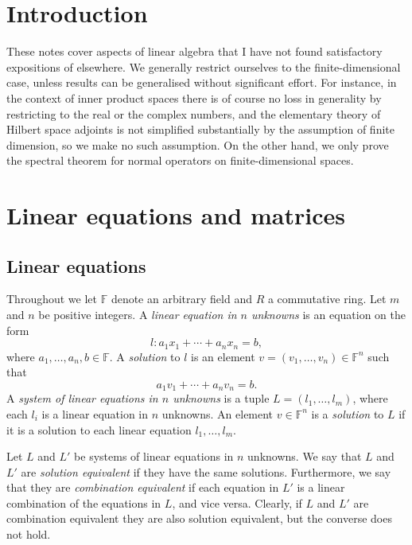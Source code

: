 \documentclass[article, a4paper, 11pt, oneside]{memoir}
\title{\doctitle}
\author{\docauthor}
\numberwithin{equation}{chapter}
\newcommand{\field}{\mathbb{F}}
\begin{document}
\maketitle

\chapter{Introduction}

These notes cover aspects of linear algebra that I have not found satisfactory expositions of elsewhere. We generally restrict ourselves to the finite-dimensional case, unless results can be generalised without significant effort. For instance, in the context of inner product spaces there is of course no loss in generality by restricting to the real or the complex numbers, and the elementary theory of Hilbert space adjoints is not simplified substantially by the assumption of finite dimension, so we make no such assumption. On the other hand, we only prove the spectral theorem for normal operators on finite-dimensional spaces.


\chapter{Linear equations and matrices}

\section{Linear equations}

Throughout we let $\field$ denote an arbitrary field and $R$ a commutative ring. Let $m$ and $n$ be positive integers. A \emph{linear equation in $n$ unknowns} is an equation on the form
%
\begin{equation*}
    l \colon a_1 x_1 + \cdots + a_n x_n = b,
\end{equation*}
%
where $a_1, \ldots, a_n, b \in \field$. A \emph{solution} to $l$ is an element $v = (v_1, \ldots, v_n) \in \field^n$ such that
%
\begin{equation*}
    a_1 v_1 + \cdots + a_n v_n = b.
\end{equation*}
%
A \emph{system of linear equations in $n$ unknowns} is a tuple $L = (l_1, \ldots, l_m)$, where each $l_i$ is a linear equation in $n$ unknowns. An element $v \in \field^n$ is a \emph{solution} to $L$ if it is a solution to each linear equation $l_1, \ldots, l_m$.

Let $L$ and $L'$ be systems of linear equations in $n$ unknowns. We say that $L$ and $L'$ are \emph{solution equivalent} if they have the same solutions. Furthermore, we say that they are \emph{combination equivalent} if each equation in $L'$ is a linear combination of the equations in $L$, and vice versa. Clearly, if $L$ and $L'$ are combination equivalent they are also solution equivalent, but the converse does not hold.
\end{document}

